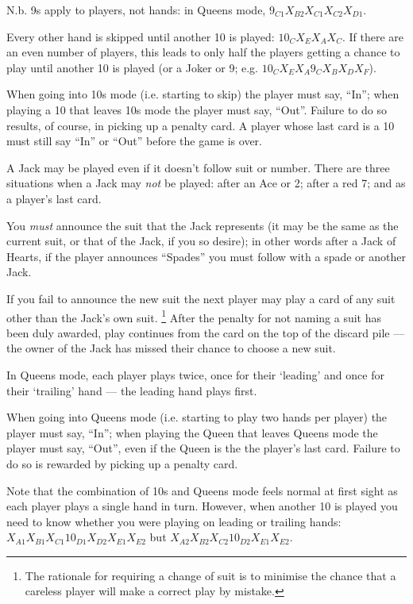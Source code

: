 \documentclass[12pt]{article}
\begin{document}
\begin{description}
    N.b. 9s apply to players, not hands: in Queens mode, $9_{C1} X_{B2} X_{C1} X_{C2} X_{D1}$.

  \item[\card{10}]
    Every other hand is skipped until another 10 is played: $10_C X_E X_A X_C$.  If there are an even number of
    players, this leads to only half the players getting a chance to play until another
    10 is played (or a Joker or 9; e.g.  $10_C X_E X_A 9_C X_B X_D X_F$).

    When going into 10s mode (i.e. starting to skip) the player must say, ``In''; when playing a
    10 that leaves 10s mode the player must say, ``Out''.  Failure to do so results, of course,
    in picking up a penalty card.  A player whose last card is a 10 must still say ``In'' or ``Out''
    before the game is over.

  \item[\card{Jack}]
    A Jack may be played even if it doesn't follow suit or number.  There are three situations
    when a Jack may \emph{not} be played:  after an Ace or 2; after a red 7; and as a player's last card.

    You \emph{must} announce the suit that the Jack represents (it may be the same as the
    current suit, or that of the Jack, if you so desire);  in other words after a Jack of
    Hearts, if the player announces ``Spades'' you must follow with a spade or another Jack.

    If you fail to announce the new suit the next player may play a card of any suit other than the Jack's own suit.%
    \footnote{The rationale for requiring a change of suit is to minimise the chance that
      a careless player will make a correct play by mistake.}
    After the penalty for not naming a suit has been duly awarded, play continues from the card on the top of the
    discard pile --- the owner of the Jack has missed their chance to choose a new suit.

  \item[\card{Queen}]
    In Queens mode, each player plays twice, once for their `leading' and once for their
    `trailing' hand --- the leading hand plays first.

    When going into Queens mode (i.e. starting to play two hands per player) the player must say, ``In''; when playing
    the Queen that leaves Queens mode the player must say, ``Out'', even if the Queen is the the player's
    last card. Failure to do so is rewarded by picking up a penalty card.  

    Note that the combination of 10s and Queens mode feels normal at first sight as each player plays a single hand in
    turn.  However, when another 10 is played you need to know whether you were playing on leading or trailing
    hands: $X_{A1} X_{B1} X_{C1} 10_{D1} X_{D2} X_{E1} X_{E2}$ but $X_{A2} X_{B2} X_{C2} 10_{D2} X_{E1} X_{E2}$.


\end{description}
\end{document}

